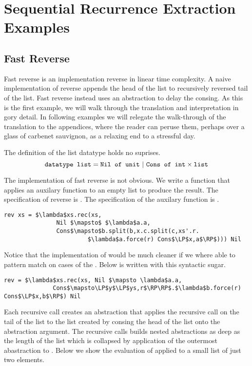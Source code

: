 \chapter{Sequential Recurrence Extraction Examples}
\section{Fast Reverse}
Fast reverse is an implementation reverse in linear time complexity.
A naive implementation of reverse appends the head of the list to recursively
reversed tail of  the list. Fast reverse instead uses an abstraction to delay
the consing. As this is the first example, we will walk through the translation
and interpretation in gory detail. In following examples we will relegate the
walk-through of the translation to the appendices, where the reader can peruse
them, perhaps over a glass of carbenet sauvignon, as a relaxing end to a
stressful day.

The definition of the list datatype holds no suprises.
\[ \texttt{datatype list} = \texttt{Nil of unit}\ |\ \texttt{Cons of int} \times \texttt{list} \]

The implementation of fast reverse is not obvious. We write a function 
that applies an auxilary function to an empty list to produce the result.  The
specification of reverse is . The specification of the auxilary function
 is .

\begin{lstlisting}
rev xs = $\lambda$xs.rec(xs,
               Nil $\mapsto$ $\lambda$a.a,
               Cons$\mapsto$b.split(b,x.c.split(c,xs'.r.
                        $\lambda$a.force(r) Cons$\LP$x,a$\RP$))) Nil
\end{lstlisting}

Notice that the implementation of  would be much cleaner if we where
able to pattern match on cases of the . Below is  written with
this syntactic sugar.

\begin{lstlisting}
rev = $\lambda$xs.rec(xs, Nil $\mapsto \lambda$a.a,
              Cons$\mapsto\LP$y$\LP$ys,r$\RP\RP$.$\lambda$b.force(r) Cons$\LP$x,b$\RP$) Nil
\end{lstlisting}

Each recursive call creates an abstraction that applies the recursive call on
the tail of the list to the list created by consing the head of the list onto
the abstraction argument. The recursive calls builds nested abstractions as
deep as the length of the list which is collapsed by application of the
outermost abastraction to . Below we show the evaluation of 
applied to a small list of just two elements.

